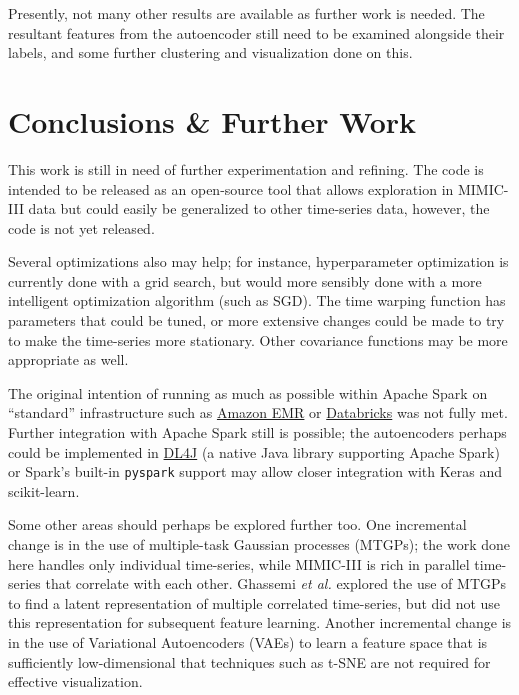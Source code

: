 \documentclass[journal]{IEEEtran}
\begin{document}
Presently, not many other results are available as further work is
needed.  The resultant features from the autoencoder still need to be
examined alongside their labels, and some further clustering and
visualization done on this.

\section{Conclusions \& Further Work}

This work is still in need of further experimentation and refining.
The code is intended to be released as an open-source tool that allows
exploration in MIMIC-III data but could easily be generalized to other
time-series data, however, the code is not yet released.

Several optimizations also may help; for instance, hyperparameter
optimization is currently done with a grid search, but would more
sensibly done with a more intelligent optimization algorithm (such as
SGD).  The time warping function has parameters that could be tuned,
or more extensive changes\cite{Lasko2015} could be made to try to make
the time-series more stationary.  Other covariance functions may be
more appropriate as well.

The original intention of running as much as possible within Apache
Spark on ``standard'' infrastructure such as
\href{https://aws.amazon.com/emr/}{Amazon EMR} or
\href{https://databricks.com/}{Databricks} was not fully met.  Further
integration with Apache Spark still is possible; the autoencoders
perhaps could be implemented in
\href{https://deeplearning4j.org/}{DL4J} (a native Java library
supporting Apache Spark) or Spark's built-in \texttt{pyspark} support
may allow closer integration with Keras and scikit-learn.

Some other areas should perhaps be explored further too.  One
incremental change is in the use of multiple-task Gaussian processes
(MTGPs); the work done here handles only individual time-series, while
MIMIC-III is rich in parallel time-series that correlate with each
other.  Ghassemi \emph{et al.}\cite{Ghassemi2015} explored the use of
MTGPs to find a latent representation of multiple correlated
time-series, but did not use this representation for subsequent
feature learning.  Another incremental change is in the use of
Variational Autoencoders (VAEs) to learn a feature space that is
sufficiently low-dimensional that techniques such as t-SNE are not
required for effective visualization.
\end{document}
